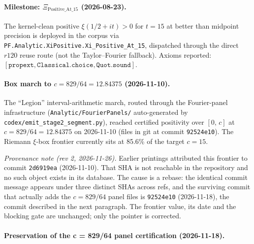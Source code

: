 \paragraph{Milestone: $\Xi_{\text{Positive\_At\_15}}$ (2026-08-23).}

The kernel-clean positive $\xi(1/2 + it) > 0$ for $t = 15$ at better than
midpoint precision is deployed in the corpus via
\texttt{PF.Analytic.XiPositive.Xi\_Positive\_At\_15}, dispatched through
the direct $r120$ reuse route (not the Taylor--Fourier fallback).  Axioms
reported: $[\mathtt{propext}, \mathtt{Classical.choice},
\mathtt{Quot.sound}]$.

\paragraph{Box march to $c = 829/64 = 12.84375$ (2026-11-10).}

The ``Legion'' interval-arithmetic march, routed through the
Fourier-panel infrastructure
(\texttt{Analytic/FourierPanels/} auto-generated by
\texttt{codex/emit\_stage2\_segment.py}), reached certified positivity
over $[0,\,c]$ at $c = 829/64 = 12.84375$ on 2026-11-10 (files in
git at commit \texttt{92524e10}).  The Riemann $\xi$-box frontier
currently sits at
85.6\% of the target $c = 15$.

\noindent\emph{Provenance note (rev 2, 2026-11-26).}  Earlier printings
attributed this frontier to commit \texttt{2d6919ea} (2026-11-10).  That SHA is
not reachable in the repository and no such object exists in its database.  The
cause is a rebase: the identical commit message appears under three distinct
SHAs across refs, and the surviving commit that actually adds the $c = 829/64$
panel files is \texttt{92524e10} (2026-11-18), the commit described in the next
paragraph.  The frontier value, its date and the blocking gate are unchanged;
only the pointer is corrected.

\paragraph{Preservation of the c = 829/64 panel certification
(2026-11-18).}

